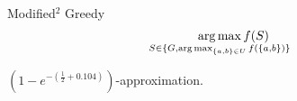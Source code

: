 \begin{frame}{Modified$^2$ Greedy}
    $$
    \argmax_{\mathclap{S \in \{G, \argmax_{\{a,b\} \in U}f(\{a, b\})\}}}f(S)
    $$

    \pause
    \begin{theorem}
        $(1 - e^{-(\frac{1}{2} + 0.104)})$-approximation.
    \end{theorem}
\end{frame}